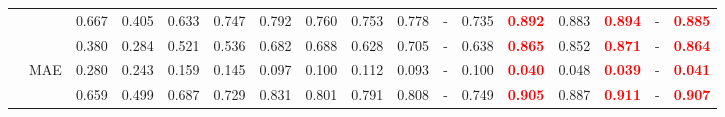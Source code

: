 \documentclass[runningheads]{llncs}
\begin{document}
\begin{table}[t]
{\begin{tabular}{@{}rl|ccccccccccc|cc|cc@{}}
    &             & 0.667                                     & 0.405                                       & 0.633                                       & 0.747                                  & 0.792                                      & 0.760                                          & 0.753                                      & 0.778                                        & -                                                & 0.735                                      & \textcolor{red}{\textbf{0.892}} & 0.883                                          & \textcolor{red}{\textbf{0.894}} & -                                         & \textcolor{red}{\textbf{0.885}} \\
    &  & 0.380                                     & 0.284                                       & 0.521                                       & 0.536                                  & 0.682                                      & 0.688                                          & 0.628                                      & 0.705                                        & -                                                & 0.638                                      & \textcolor{red}{\textbf{0.865}} & 0.852                                          & \textcolor{red}{\textbf{0.871}} & -                                         & \textcolor{red}{\textbf{0.864}} \\
    & MAE                  & 0.280                                     & 0.243                                       & 0.159                                       & 0.145                                  & 0.097                                      & 0.100                                          & 0.112                                      & 0.093                                        & -                                                & 0.100                                      & \textcolor{red}{\textbf{0.040}} & 0.048                                          & \textcolor{red}{\textbf{0.039}} & -                                         & \textcolor{red}{\textbf{0.041}} \\
    &               & 0.659                                     & 0.499                                       & 0.687                                       & 0.729                                  & 0.831                                      & 0.801                                          & 0.791                                      & 0.808                                        & -                                                & 0.749                                      & \textcolor{red}{\textbf{0.905}} & 0.887                                          & \textcolor{red}{\textbf{0.911}} & -                                         & \textcolor{red}{\textbf{0.907}} \\

\end{tabular}}
\end{table}
\end{document}
